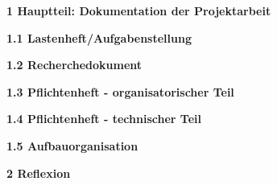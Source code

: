 \begin{huge}
\bfseries 1 Hauptteil: Dokumentation der Projektarbeit
\end{huge}
\newpage
\begin{huge}
\bfseries 1.1 Lastenheft/Aufgabenstellung
\end{huge}
\newpage
\begin{huge}
\bfseries 1.2 Recherchedokument
\end{huge}
\newpage
\begin{huge}
\bfseries 1.3 Pflichtenheft - organisatorischer Teil
\end{huge}
\newpage
\begin{huge}
\bfseries 1.4 Pflichtenheft - technischer Teil
\end{huge}
\newpage
\begin{huge}
\bfseries 1.5 Aufbauorganisation
\end{huge}
\newpage
\begin{huge}
\bfseries 2 Reflexion
\end{huge}
